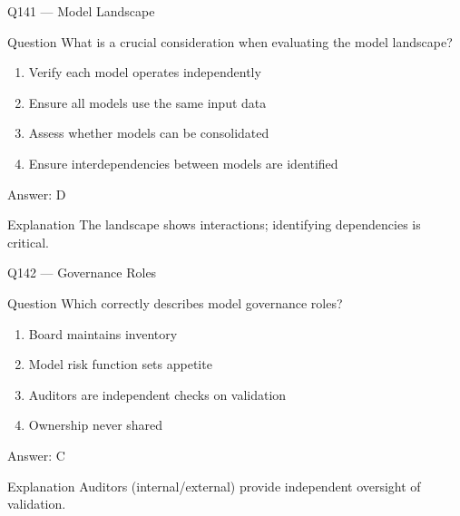 \documentclass[aspectratio=169,8pt]{beamer}
\begin{document}
	\begin{frame}{Q141 --- Model Landscape}
		\begin{block}{Question}
			What is a crucial consideration when evaluating the model landscape?
		\end{block}
		\begin{enumerate}
			\item Verify each model operates independently
			\item Ensure all models use the same input data
			\item Assess whether models can be consolidated
			\item Ensure interdependencies between models are identified
		\end{enumerate}
		\begin{exampleblock}{Answer: D}\end{exampleblock}
		\begin{block}{Explanation}
			The landscape shows interactions; identifying dependencies is critical.
		\end{block}
	\end{frame}
	
	\begin{frame}{Q142 --- Governance Roles}
		\begin{block}{Question}
			Which correctly describes model governance roles?
		\end{block}
		\begin{enumerate}
			\item Board maintains inventory
			\item Model risk function sets appetite
			\item Auditors are independent checks on validation
			\item Ownership never shared
		\end{enumerate}
		\begin{exampleblock}{Answer: C}\end{exampleblock}
		\begin{block}{Explanation}
			Auditors (internal/external) provide independent oversight of validation.
		\end{block}
	\end{frame}
	
\end{document}
